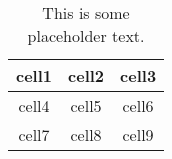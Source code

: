 
\begin{table}
	\centering
	\begin{tabular}{ |c|c|c| }
		\hline
		cell1 & cell2 & cell3 \\
		\hline
		cell4 & cell5 & cell6 \\
		cell7 & cell8 & cell9 \\
		\hline
	\end{tabular}
	\caption{This is some placeholder text.}
\end{table}

